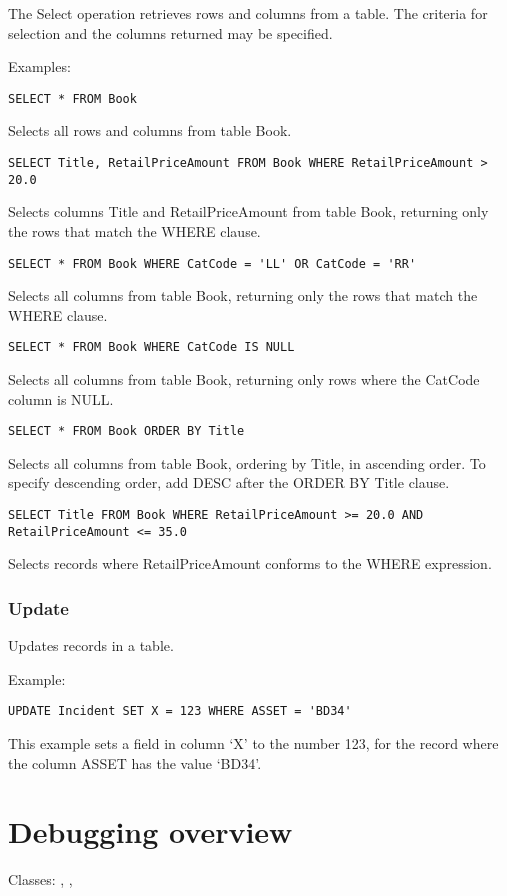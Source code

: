 The Select operation retrieves rows and columns from a table. The criteria
for selection and the columns returned may be specified.

Examples:

\verb$SELECT * FROM Book$

Selects all rows and columns from table Book.

\verb$SELECT Title, RetailPriceAmount FROM Book WHERE RetailPriceAmount > 20.0$

Selects columns Title and RetailPriceAmount from table Book, returning only
the rows that match the WHERE clause.

\verb$SELECT * FROM Book WHERE CatCode = 'LL' OR CatCode = 'RR'$

Selects all columns from table Book, returning only
the rows that match the WHERE clause.

\verb$SELECT * FROM Book WHERE CatCode IS NULL$

Selects all columns from table Book, returning only rows where the CatCode column
is NULL.

\verb$SELECT * FROM Book ORDER BY Title$

Selects all columns from table Book, ordering by Title, in ascending order. To specify
descending order, add DESC after the ORDER BY Title clause.

\verb$SELECT Title FROM Book WHERE RetailPriceAmount >= 20.0 AND RetailPriceAmount <= 35.0$

Selects records where RetailPriceAmount conforms to the WHERE expression.

\subsubsection{Update}

Updates records in a table.

Example:

\verb$UPDATE Incident SET X = 123 WHERE ASSET = 'BD34'$

This example sets a field in column `X' to the number 123, for the record
where the column ASSET has the value `BD34'.


\section{Debugging overview}\label{debuggingoverview}

Classes: , ,
\rtfsp{}

